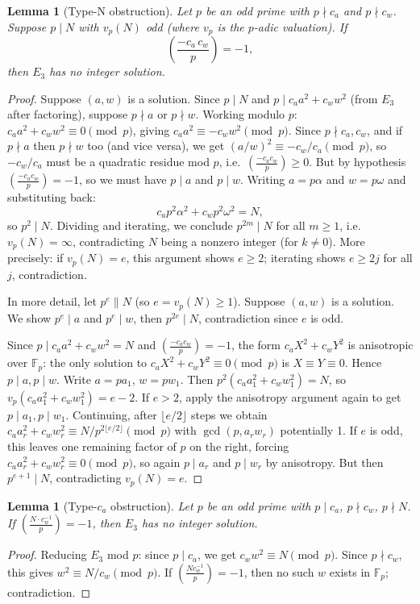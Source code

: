 \documentclass[12pt]{article}
\newtheorem{lemma}[theorem]{Lemma}
\newcommand{\leg}[2]{\left(\frac{#1}{#2}\right)}
\begin{document}
\begin{lemma}[Type-N obstruction]\label{lem:typeN}
Let $p$ be an odd prime with $p \nmid c_a$ and $p \nmid c_w$. 
Suppose $p \mid N$ with $v_p(N)$ odd (where $v_p$ is the $p$-adic valuation).
If
\[
\leg{-c_a\,c_w}{p} = -1,
\]
then $E_3$ has no integer solution.
\end{lemma}
\begin{proof}
Suppose $(a, w)$ is a solution. Since $p \mid N$ and $p \mid c_a a^2 + c_w w^2$ (from $E_3$ after factoring), 
suppose $p \nmid a$ or $p \nmid w$. 
Working modulo $p$: $c_a a^2 + c_w w^2 \equiv 0 \pmod p$, giving 
$c_a a^2 \equiv -c_w w^2 \pmod p$. Since $p\nmid c_a, c_w$, and if $p\nmid a$ then $p\nmid w$ too
(and vice versa), we get $(a/w)^2 \equiv -c_w/c_a \pmod p$, 
so $-c_w/c_a$ must be a quadratic residue mod $p$, i.e.\ $\leg{-c_a c_w}{p} \geq 0$.
But by hypothesis $\leg{-c_a c_w}{p} = -1$, so we must have $p \mid a$ and $p \mid w$.
Writing $a = p\alpha$ and $w = p\omega$ and substituting back:
\[
c_a p^2 \alpha^2 + c_w p^2 \omega^2 = N,
\]
so $p^2 \mid N$. Dividing and iterating, we conclude $p^{2m} \mid N$ for all $m \geq 1$,
i.e.\ $v_p(N) = \infty$, contradicting $N$ being a nonzero integer (for $k \neq 0$). 
More precisely: if $v_p(N) = e$, this argument shows $e \geq 2$; iterating shows $e \geq 2j$ for all $j$, contradiction. 
\medskip

In more detail, let $p^e \| N$ (so $e = v_p(N) \geq 1$). Suppose $(a,w)$ is a solution.
We show $p^e \mid a$ and $p^e \mid w$, then $p^{2e} \mid N$, contradiction since $e$ is odd.

Since $p \mid c_a a^2 + c_w w^2 = N$ and $\leg{-c_a c_w}{p}=-1$, the form $c_a X^2+ c_w Y^2$ is anisotropic 
over $\mathbb{F}_p$: the only solution to $c_a X^2 + c_w Y^2 \equiv 0 \pmod p$ is $X \equiv Y \equiv 0$.
Hence $p \mid a, p \mid w$. Write $a = pa_1$, $w = pw_1$. Then 
$p^2(c_a a_1^2 + c_w w_1^2) = N$, so $v_p(c_a a_1^2 + c_w w_1^2) = e - 2$.
If $e > 2$, apply the anisotropy argument again to get $p \mid a_1, p \mid w_1$.
Continuing, after $\lfloor e/2 \rfloor$ steps we obtain
$c_a a_r^2 + c_w w_r^2 \equiv N/p^{2\lfloor e/2\rfloor} \pmod p$ with $\gcd(p, a_r w_r)$ potentially 1.
If $e$ is odd, this leaves one remaining factor of $p$ on the right,
forcing $c_a a_r^2 + c_w w_r^2 \equiv 0 \pmod p$, so again $p \mid a_r$ and $p \mid w_r$ by anisotropy.
But then $p^{e+1} \mid N$, contradicting $v_p(N) = e$.
\end{proof}

\begin{lemma}[Type-$c_a$ obstruction]\label{lem:typeca}
Let $p$ be an odd prime with $p \mid c_a$, $p \nmid c_w$, $p \nmid N$.
If $\leg{N\cdot c_w^{-1}}{p} = -1$, then $E_3$ has no integer solution.
\end{lemma}
\begin{proof}
Reducing $E_3$ mod $p$: since $p \mid c_a$, we get $c_w w^2 \equiv N \pmod p$.
Since $p \nmid c_w$, this gives $w^2 \equiv N/c_w \pmod p$.
If $\leg{N c_w^{-1}}{p} = -1$, then no such $w$ exists in $\mathbb{F}_p$; contradiction.
\end{proof}
\end{document}
